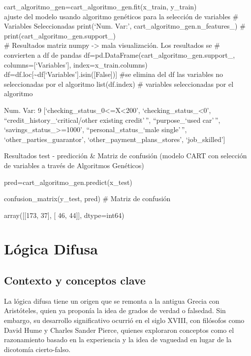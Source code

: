 \documentclass[
  a4paper,
  DIV=11,
  numbers=noendperiod]{scrreprt}
\begin{document}
cart\_algoritmo\_gen=cart\_algoritmo\_gen.fit(x\_train, y\_train)\\
ajuste del modelo usando algoritmo genéticos para la selección de
variables \# Variables Seleccionadas print(`Num. Var:',
cart\_algoritmo\_gen.n\_features\_) \#
print(cart\_algoritmo\_gen.support\_)\\
\# Resultados matriz numpy -\textgreater{} mala visualización. Los
resultados se \# convierten a df de pandas
df=pd.DataFrame(cart\_algoritmo\_gen.support\_,
columns={[}`Variables'{]}, index=x\_train.columns)
df=df.loc{[}\textasciitilde df{[}`Variables'{]}.isin({[}False{]}){]}
\#se elimina del df las variables no seleccionadas por el algoritmo
list(df.index) \# variables seleccionadas por el algoritmo

Num. Var: 9 {[}`checking\_status\_0\textless=X\textless200',
`checking\_status\_\textless0', ``credit\_history\_`critical/other
existing credit'\,'', ``purpose\_`used car'\,'',
`savings\_status\_\textgreater=1000', ``personal\_status\_`male
single'\,'', `other\_parties\_guarantor',
`other\_payment\_plans\_stores', `job\_skilled'{]}

Resultados test - predicción \& Matriz de confusión (modelo CART con
selección de variables a través de Algoritmos Genéticos)

pred=cart\_algoritmo\_gen.predict(x\_test)

confusion\_matrix(y\_test, pred) \# Matriz de confusión

array({[}{[}173, 37{]}, {[} 46, 44{]}{]}, dtype=int64)


\chapter{Lógica Difusa}\label{luxf3gica-difusa}

\section{Contexto y conceptos clave}\label{contexto-y-conceptos-clave}

La lógica difusa tiene un origen que se remonta a la antigua Grecia con
Aristóteles, quien ya proponía la idea de grados de verdad o falsedad.
Sin embargo, su desarrollo significativo ocurrió en el siglo XVIII, con
filósofos como David Hume y Charles Sander Pierce, quienes exploraron
conceptos como el razonamiento basado en la experiencia y la idea de
vaguedad en lugar de la dicotomía cierto-falso.
\end{document}
